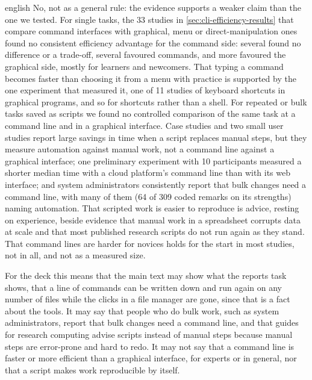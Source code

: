 \begin{onlyin}{english} %
No, not as a general rule: the evidence supports a weaker claim than
the one we tested.  For single tasks, the 33 studies in
\cref{sec:cli-efficiency-results} that compare command interfaces with
graphical, menu or direct-manipulation ones found no consistent
efficiency advantage for the command side: several found no difference
or a trade-off, several favoured commands, and more favoured the
graphical side, mostly for learners and newcomers.  That typing a
command becomes faster than choosing it from a menu with practice is
supported by the one experiment that measured it, one of 11 studies of
keyboard shortcuts in graphical programs, and so for shortcuts rather
than a shell.  For repeated or bulk tasks saved as scripts we found no
controlled comparison of the same task at a command line and in a
graphical interface.  Case studies and two small user studies report
large savings in time when a script replaces manual steps, but they
measure automation against manual work, not a command line against a
graphical interface; one preliminary experiment with 10 participants
measured a shorter median time with a cloud platform's command line than
with its web interface; and
system administrators consistently report that bulk changes need a
command line, with many of them (64 of 309 coded remarks on its
strengths) naming automation.  That
scripted work is easier to
reproduce is advice, resting on experience, beside evidence that manual
work in a spreadsheet corrupts data at scale and that most published
research scripts do not run again as they stand.  That command lines are
harder for novices holds for the start in most studies, not in all, and
not as a measured size.

For the deck this means that the main text may show what the reports
task shows, that a line of commands can be written down and run again
on any number of files while the clicks in a file manager are gone,
since that is a fact about the tools.  It may say that people who do
bulk work, such as system administrators, report that bulk changes need
a command line, and that guides for research computing advise scripts
instead of manual steps because manual steps are error-prone and hard
to redo.  It may not say that a command line is faster or more
efficient than a graphical interface, for experts or in general, nor
that a script makes work reproducible by itself.
\end{onlyin}

